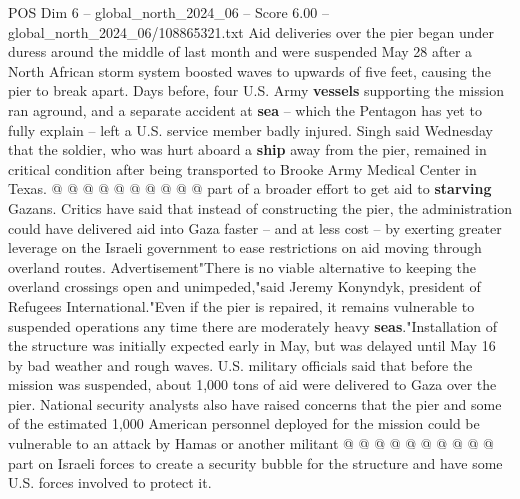 \begin{textsample}{POS Dim 6 – global\_north\_2024\_06 – Score 6.00 – global\_north\_2024\_06/108865321.txt}
Aid deliveries over the pier began under duress around the middle of last month and were suspended May 28 after a North African storm system boosted waves to upwards of five feet, causing the pier to break apart.
Days before, four U.S.
Army \textbf{vessels} supporting the mission ran aground, and a separate accident at \textbf{sea} -- which the Pentagon has yet to fully explain -- left a U.S. service member badly injured.
Singh said Wednesday that the soldier, who was hurt aboard a \textbf{ship} away from the pier, remained in critical condition after being transported to Brooke Army Medical Center in Texas. @ @ @ @ @ @ @ @ @ @ part of a broader effort to get aid to \textbf{starving} Gazans.
Critics have said that instead of constructing the pier, the administration could have delivered aid into Gaza faster -- and at less cost -- by exerting greater leverage on the Israeli government to ease restrictions on aid moving through overland routes.
Advertisement"There is no viable alternative to keeping the overland crossings open and unimpeded,"said Jeremy Konyndyk, president of Refugees International."Even if the pier is repaired, it remains vulnerable to suspended operations any time there are moderately heavy \textbf{seas}."Installation of the structure was initially expected early in May, but was delayed until May 16 by bad weather and rough waves.
U.S. military officials said that before the mission was suspended, about 1,000 tons of aid were delivered to Gaza over the pier.
National security analysts also have raised concerns that the pier and some of the estimated 1,000 American personnel deployed for the mission could be vulnerable to an attack by Hamas or another militant @ @ @ @ @ @ @ @ @ @ part on Israeli forces to create a security bubble for the structure and have some U.S. forces involved to protect it.

\end{textsample}
